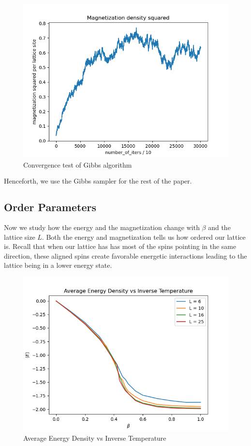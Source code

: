 \documentclass{article}
\begin{document}
    \begin{figure}[ht]
        \includegraphics[width=\columnwidth]{plots/mag_sq_density_gibbs.png}
        \caption{Convergence test of Gibbs algorithm}
        \label{fig:3}
    \end{figure}
   
Henceforth, we use the Gibbs sampler for the rest of the paper.

\subsection{Order Parameters}

Now we study how the energy and the magnetization change with $\beta$ and the lattice size $L$. 
Both the energy and magnetization tells us how ordered our lattice is. Recall that when our lattice has
has most of the spins pointing in the same direction, these aligned spins create favorable energetic interactions
leading to the lattice being in a lower energy state.

\begin{figure}[ht]
    \includegraphics[width=\columnwidth]{plots/avg_energy_vs_beta.png}
    \caption{Average Energy Density vs Inverse Temperature}
    \label{fig:3}
\end{figure}
\end{document}
